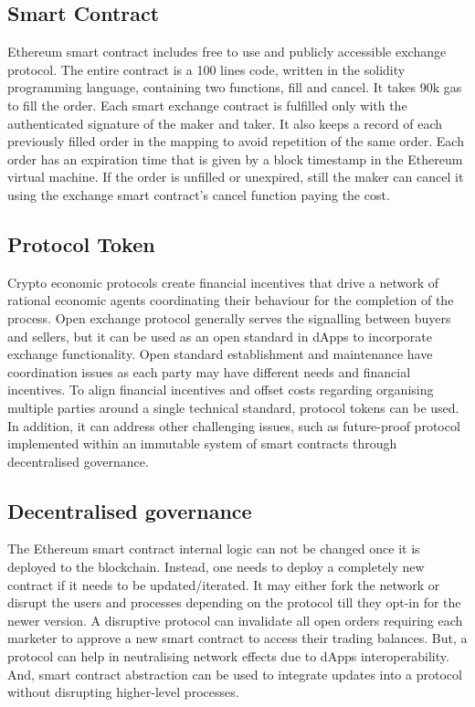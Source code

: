 \documentclass{article}
\begin{document}
\subsection{Smart Contract}
Ethereum smart contract includes free to use and publicly accessible exchange protocol. The entire contract is a 100 lines code, written in the solidity programming language, containing two functions, fill and cancel. It takes 90k gas to fill the order. Each smart exchange contract is fulfilled only with the authenticated signature of the maker and taker. It also keeps a record of each previously filled order in the mapping to avoid repetition of the same order. Each order has an expiration time that is given by a block timestamp in the Ethereum virtual machine. If the order is unfilled or unexpired, still the maker can cancel it using the exchange smart contract’s cancel function paying the cost. 

\subsection{Protocol Token}
Crypto economic protocols create financial incentives that drive a network of rational economic agents coordinating their behaviour for the completion of the process. Open exchange protocol generally serves the signalling between buyers and sellers, but it can be used as an open standard in dApps to incorporate exchange functionality. Open standard establishment and maintenance have coordination issues as each party may have different needs and financial incentives. To align financial incentives and offset costs regarding organising multiple parties around a single technical standard, protocol tokens can be used. In addition, it can address other challenging issues, such as future-proof protocol implemented within an immutable system of smart contracts through decentralised governance. 

\subsection{Decentralised governance}
The Ethereum smart contract internal logic can not be changed once it is deployed to the blockchain. Instead, one needs to deploy a completely new contract if it needs to be updated/iterated. It may either fork the network or disrupt the users and processes depending on the protocol till they opt-in for the newer version. A disruptive protocol can invalidate all open orders requiring each marketer to approve a new smart contract to access their trading balances. But, a protocol can help in neutralising network effects due to dApps interoperability. And, smart contract abstraction can be used to integrate updates into a protocol without disrupting higher-level processes. 
\end{document}
